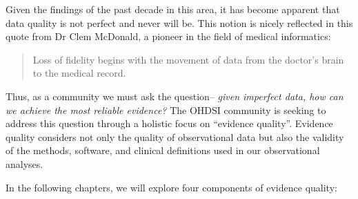 \documentclass[11pt]{book}
\theoremstyle{definition}
\theoremstyle{definition}
\theoremstyle{definition}
\theoremstyle{remark}
\begin{document}
Given the findings of the past decade in this area, it has become apparent that data quality is not perfect and never will be. This notion is nicely reflected in this quote from Dr Clem McDonald, a pioneer in the field of medical informatics:

\begin{quote}
Loss of fidelity begins with the movement of data from the doctor's brain to the medical record. 
\end{quote}

Thus, as a community we must ask the question-- \emph{given imperfect data, how can we achieve the most reliable evidence?} The OHDSI community is seeking to address this question through a holistic focus on ``evidence quality''. Evidence quality considers not only the quality of observational data but also the validity of the methods, software, and clinical definitions used in our observational analyses.  

In the following chapters, we will explore four components of evidence quality:
\end{document}
